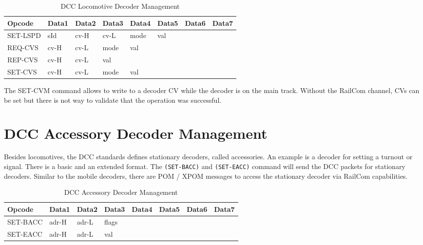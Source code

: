 \begin{table}[ht!]
    \begin{center}
        \caption{DCC Locomotive Decoder Management}
        \begin{tabular}{|l|l|l|l|l|l|l|l|}
            \toprule
            \textbf{Opcode} & \textbf{Data1} & \textbf{Data2} & \textbf{Data3} & \textbf{Data4} & \textbf{Data5} & \textbf{Data6} & \textbf{Data7} \\
            \midrule
            SET-LSPD & sId & cv-H & cv-L & mode & val & & \\
            REQ-CVS  & cv-H & cv-L & mode & val & & & \\
            REP-CVS  & cv-H & cv-L & val  & & & & \\
            SET-CVS  & cv-H & cv-L & mode & val & & & \\
            \bottomrule
        \end{tabular}
    \end{center}
\end{table}

The SET-CVM command allows to write to a decoder CV while the decoder is on the main track. Without the RailCom channel, CVs can be set but there is not way to validate that the operation was successful.

\section{DCC Accessory Decoder Management}

Besides locomotives, the DCC standards defines stationary decoders, called accessories. An example is a decoder for setting a turnout or signal. There is a basic and an extended format. The \texttt{(SET-BACC)} and \texttt{(SET-EACC)} command will send the DCC packets for stationary decoders. Similar to the mobile decoders, there are POM / XPOM messages to access the stationary decoder via RailCom capabilities.

\begin{table}[ht!]
    \begin{center}
        \caption{DCC Accessory Decoder Management}
        \begin{tabular}{|l|l|l|l|l|l|l|l|}
            \toprule
            \textbf{Opcode} & \textbf{Data1} & \textbf{Data2} & \textbf{Data3} & \textbf{Data4} & \textbf{Data5} & \textbf{Data6} & \textbf{Data7} \\
            \midrule
            SET-BACC & adr-H & adr-L & flags & & & & \\
            SET-EACC & adr-H & adr-L & val & & & & \\
            \bottomrule
        \end{tabular}
    \end{center}
\end{table}

